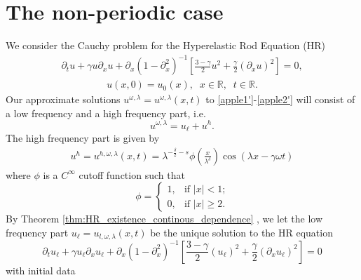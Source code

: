 \documentclass[12pt,reqno]{amsart}
\newcommand{\rr}{\mathbb{R}}
\newcommand{\p}{\partial}
\theoremstyle{plain}  %
\theoremstyle{definition}
\begin{document}
\section{
The non-periodic case
}
\setcounter{equation}{0}
\vskip0.1in
We consider the Cauchy problem for the Hyperelastic Rod Equation (HR)
\begin{equation}
	\begin{split}
		\p_t u + \gamma u \p_x u + \p_x \left( 1 - \p_x^2
		\right)^{-1}  \left[ \frac{3-\gamma}{2}u^2 +
		\frac{\gamma}{2} \left( \p_x u \right)^2
		\right] = 0,
		\label{apple1'}
	\end{split}
\end{equation}
%
\begin{equation}
	\begin{split}
		u(x,0) = u_0(x), \; \; x \in \rr, \; \; t \in \rr. 
		\label{apple2'}
	\end{split}
\end{equation}
Our approximate solutions $u^{\omega, \lambda} = u^{\omega,
\lambda}(x,t)$ to \eqref{apple1'}-\eqref{apple2'} will
consist of a low frequency and a high frequency part,
i.e.
\begin{equation}
	\label{apple1}
	u^{\omega,\lambda} = u_\ell + u^h.
\end{equation}
The high frequency part is given by 
\begin{equation}
	\begin{split}
		u^h = u^{h,\omega,\lambda}(x,t) =
		\lambda^{-\frac{\delta}{2} -s}
		\phi \left (\frac{x}{\lambda^\delta}\right )
		\cos(\lambda x - \gamma \omega t)
	\end{split}
\end{equation}
where $\phi$ is a $C^\infty$ cutoff function such that
\begin{equation*}
	\phi = 
	\begin{cases}
		1, &\text{if $|x|<1$;} \\
		0, &\text{if $|x| \ge 2$.} 
	\end{cases}
\end{equation*}
By Theorem \ref{thm:HR_existence_continous_dependence} ,
we let the low frequency part $u_\ell = u_{l,
\omega, \lambda}(x,t)$ be the unique solution to the HR equation
\begin{equation}
	\p_t u_\ell + \gamma u_\ell \p_x u_\ell + \p_x (1- \p_x^2)^{-1}  \left[
	\frac{3- \gamma}{2}(u_\ell)^2 + \frac{\gamma}{2}\left( \p_x u_\ell
	\right)^2 \right] = 0
	\label{apple1*}
\end{equation}
with initial data
\end{document}
